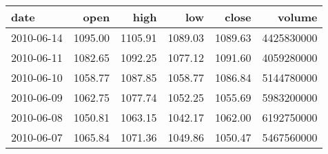 \documentclass[
]{article}
\begin{document}
\begin{tabular}{l|r|r|r|r|r}
\hline
date & open & high & low & close & volume\\
\hline
2010-06-14 & 1095.00 & 1105.91 & 1089.03 & 1089.63 & 4425830000\\
\hline
2010-06-11 & 1082.65 & 1092.25 & 1077.12 & 1091.60 & 4059280000\\
\hline
2010-06-10 & 1058.77 & 1087.85 & 1058.77 & 1086.84 & 5144780000\\
\hline
2010-06-09 & 1062.75 & 1077.74 & 1052.25 & 1055.69 & 5983200000\\
\hline
2010-06-08 & 1050.81 & 1063.15 & 1042.17 & 1062.00 & 6192750000\\
\hline
2010-06-07 & 1065.84 & 1071.36 & 1049.86 & 1050.47 & 5467560000\\
\hline
\end{tabular}
\end{document}
